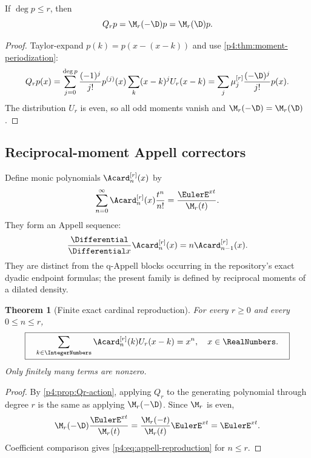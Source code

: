 \documentclass[11pt]{article}
\numberwithin{equation}{section}
\newtheorem{theorem}{Theorem}[section]
\theoremstyle{definition}
\theoremstyle{remark}
\begin{document}
\begin{proposition}
\label{p4:prop:Qr-action}
If $\deg p\le r$, then
\begin{equation}
 Q_rp=\M_r(-\D)p=\M_r(\D)p.
 \label{p4:eq:Qr-action}
\end{equation}
\end{proposition}

\begin{proof}
Taylor-expand $p(k)=p(x-(x-k))$ and use \cref{p4:thm:moment-periodization}:
\[
 Q_rp(x)=\sum_{j=0}^{\deg p}\frac{(-1)^j}{j!}p^{(j)}(x)
 \sum_k(x-k)^jU_r(x-k)
 =\sum_j\mu_j^{[r]}\frac{(-\D)^j}{j!}p(x).
\]
The distribution $U_r$ is even, so all odd moments vanish and $\M_r(-\D)=\M_r(\D)$.
\end{proof}

\subsection{Reciprocal-moment Appell correctors}
Define monic polynomials $\Acard_n^{[r]}(x)$ by
\begin{equation}
 \sum_{n=0}^{\infty}\Acard_n^{[r]}(x)\frac{t^n}{n!}
 =\frac{\EulerE^{xt}}{\M_r(t)}.
 \label{p4:eq:appell-generating}
\end{equation}
They form an Appell sequence:
\begin{equation}
 \frac{\Differential}{\Differential x}\Acard_n^{[r]}(x)=n\Acard_{n-1}^{[r]}(x).
 \label{p4:eq:appell-derivative}
\end{equation}
They are distinct from the q-Appell blocks occurring in the repository's exact dyadic endpoint formulas; the present family is defined by reciprocal moments of a dilated density.

\begin{theorem}[Finite exact cardinal reproduction]
\label{p4:thm:appell-reproduction}
For every $r\ge0$ and every $0\le n\le r$,
\begin{equation}
 \boxed{\quad
 \sum_{k\in\IntegerNumbers}\Acard_n^{[r]}(k)U_r(x-k)=x^n,
 \quad x\in\RealNumbers.
 \quad}
 \label{p4:eq:appell-reproduction}
\end{equation}
Only finitely many terms are nonzero.
\end{theorem}

\begin{proof}
By \cref{p4:prop:Qr-action}, applying $Q_r$ to the generating polynomial through degree $r$ is the same as applying $\M_r(-\D)$.  Since $\M_r$ is even,
\[
 \M_r(-\D)\frac{\EulerE^{xt}}{\M_r(t)}
 =\frac{\M_r(-t)}{\M_r(t)}\EulerE^{xt}=\EulerE^{xt}.
\]
Coefficient comparison gives \eqref{p4:eq:appell-reproduction} for $n\le r$.
\end{proof}
\end{document}

